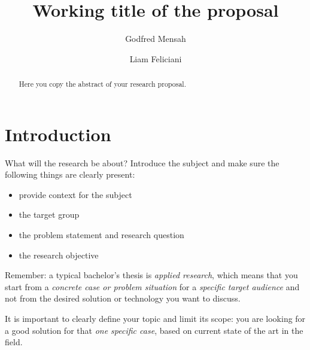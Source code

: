 \documentclass[english]{hogent-article}
\title{Working title of the proposal}
\author{Godfred Mensah}
\author{Liam Feliciani}
\begin{document}
\begin{abstract}
  Here you copy the abstract of your research proposal.
\end{abstract}

\tableofcontents

\bigskip

%
%

%
%
%
%

\section{Introduction}%
\label{sec:Introduction}

What will the research be about? Introduce the subject and make sure the following things are clearly present:

\begin{itemize}
  \item provide context for the subject
  \item the target group
  \item the problem statement and research question
  \item the research objective
\end{itemize}

Remember: a typical bachelor's thesis is \emph{applied research}, which means that you start from a \emph{concrete case or problem situation} for a \emph{specific target audience} and not from the desired solution or technology you want to discuss.

It is important to clearly define your topic and limit its scope: you are looking for a good solution for that \textit{one specific case}, based on current state of the art in the field.
\end{document}

